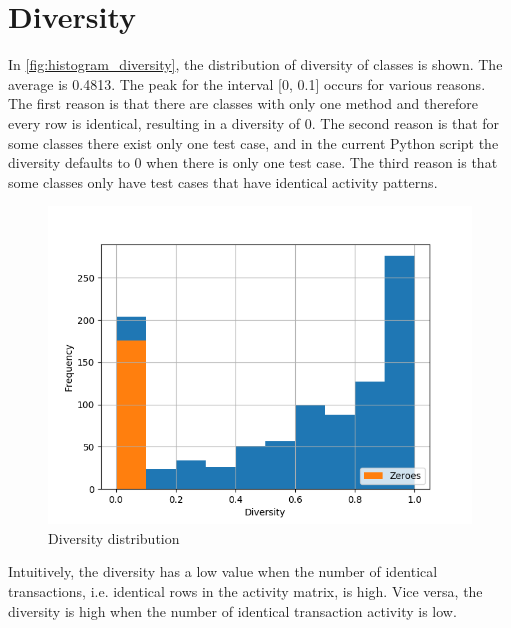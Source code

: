 \documentclass[twoside,a4paper,11pt]{memoir}
\begin{document}
\section{Diversity}

In \autoref{fig:histogram_diversity}, the distribution of diversity of classes is shown.
The average is 0.4813.
The peak for the interval [0, 0.1] occurs for various reasons.
The first reason is that there are classes with only one method and therefore every row is identical, resulting in a diversity of 0.
The second reason is that for some classes there exist only one test case, and in the current Python script the diversity defaults to 0 when there is only one test case.
The third reason is that some classes only have test cases that have identical activity patterns.

\begin{figure}
    \centering
    \includegraphics[width=\linewidth]{figures/histogram_diversity}
    \caption{Diversity distribution}
    \label{fig:histogram_diversity}
\end{figure}

Intuitively, the diversity has a low value when the number of identical transactions, i.e. identical rows in the activity matrix, is high.
Vice versa, the diversity is high when the number of identical transaction activity is low.
\end{document}
